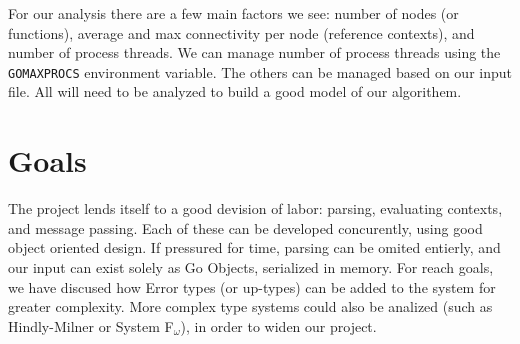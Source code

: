 \documentclass{article}[9pt]
\begin{document}
\begin{multicols}{2}
For our analysis there are a few main factors we see: number of nodes
(or functions), average and max connectivity per node (reference
contexts), and number of process threads. We can manage number of
process threads using the \texttt{GOMAXPROCS} environment
variable. The others can be managed based on our input file. All will
need to be analyzed to build a good model of our algorithem.

\section*{Goals}
The project lends itself to a good devision of labor: parsing,
evaluating contexts, and message passing. Each of these can be
developed concurently, using good object oriented design. If pressured
for time, parsing can be omited entierly, and our input can exist
solely as Go Objects, serialized in memory. For reach goals, we have
discused how Error types (or up-types) can be added to the system for
greater complexity. More complex type systems could also be analized
(such as Hindly-Milner or System F$_\omega$), in order to widen our
project.
\end{multicols}
\end{document}
